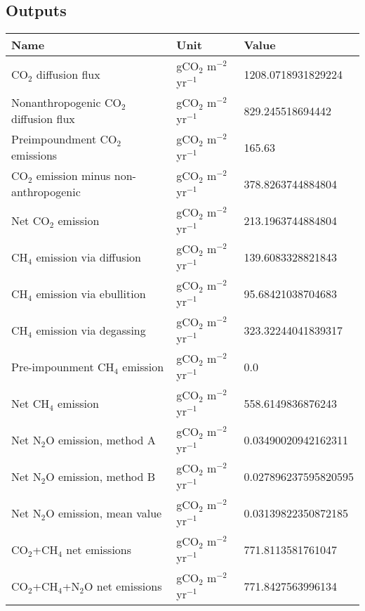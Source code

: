 \documentclass{article}%
\begin{document}
%
\subsection{Outputs}%
\label{subsec:Outputs}%
\begin{center}%
\renewcommand{\arraystretch}{1.0}%
\begin{tabu}{@{}p{10cm} X[c] X[l]@{}}%
\toprule%
\textbf{Name}&\textbf{Unit}&\textbf{Value}\\%
\midrule%
CO$_2$ diffusion flux&gCO$_2$ m$^{-2}$ yr$^{-1}$&\num[round-precision=4,round-mode=figures]{1208.0718931829224}\\%
Nonanthropogenic CO$_2$ diffusion flux&gCO$_2$ m$^{-2}$ yr$^{-1}$&\num[round-precision=4,round-mode=figures]{829.245518694442}\\%
Preimpoundment CO$_2$ emissions&gCO$_2$ m$^{-2}$ yr$^{-1}$&\num[round-precision=4,round-mode=figures]{165.63}\\%
CO$_2$ emission minus non-anthropogenic&gCO$_2$ m$^{-2}$ yr$^{-1}$&\num[round-precision=4,round-mode=figures]{378.8263744884804}\\%
Net CO$_2$ emission&gCO$_2$ m$^{-2}$ yr$^{-1}$&\num[round-precision=4,round-mode=figures]{213.1963744884804}\\%
CH$_4$ emission via diffusion&gCO$_2$ m$^{-2}$ yr$^{-1}$&\num[round-precision=4,round-mode=figures]{139.6083328821843}\\%
CH$_4$ emission via ebullition&gCO$_2$ m$^{-2}$ yr$^{-1}$&\num[round-precision=4,round-mode=figures]{95.68421038704683}\\%
CH$_4$ emission via degassing&gCO$_2$ m$^{-2}$ yr$^{-1}$&\num[round-precision=4,round-mode=figures]{323.32244041839317}\\%
Pre-impounment CH$_4$ emission&gCO$_2$ m$^{-2}$ yr$^{-1}$&\num[round-precision=4,round-mode=figures]{0.0}\\%
Net CH$_4$ emission&gCO$_2$ m$^{-2}$ yr$^{-1}$&\num[round-precision=4,round-mode=figures]{558.6149836876243}\\%
Net N$_2$O emission, method A&gCO$_2$ m$^{-2}$ yr$^{-1}$&\num[round-precision=4,round-mode=figures]{0.03490020942162311}\\%
Net N$_2$O emission, method B&gCO$_2$ m$^{-2}$ yr$^{-1}$&\num[round-precision=4,round-mode=figures]{0.027896237595820595}\\%
Net N$_2$O emission, mean value&gCO$_2$ m$^{-2}$ yr$^{-1}$&\num[round-precision=4,round-mode=figures]{0.03139822350872185}\\%
\midrule%
CO$_2$+CH$_4$ net emissions&gCO$_2$ m$^{-2}$ yr$^{-1}$&\num[round-precision=4,round-mode=figures]{771.8113581761047}\\%
\midrule%
CO$_2$+CH$_4$+N$_2$O net emissions&gCO$_2$ m$^{-2}$ yr$^{-1}$&\num[round-precision=4,round-mode=figures]{771.8427563996134}\\\bottomrule%
%
\end{tabu}%
\end{center}%
\end{document}
